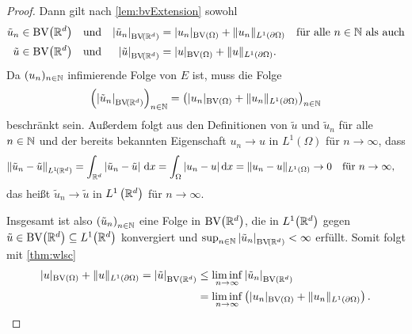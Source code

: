 \begin{proof}
  Dann gilt nach \cref{lem:bvExtension} sowohl
  \begin{align*}
    \tilde{u}_n
    &\in
    \textup{BV}\!\left(\mathbb{R}^d\right)
    &&\text{und}
    &\left|\tilde{u}_n\right|_{\textup{BV}\!\left(\mathbb{R}^d\right)} 
    &= 
    |u_n|_{\textup{BV}(\Omega)}+\Vert u_n\Vert_{L^1(\partial\Omega)}
    \quad\text{für alle }n\in\mathbb{N} \text{ als auch}\\
    \tilde{u}
    &\in
    \textup{BV}\!\left(\mathbb{R}^d\right)
    &&\text{und}
    &\left|\tilde{u}\right|_{\textup{BV}\!\left(\mathbb{R}^d\right)} 
    &=
    |u|_{\textup{BV}(\Omega)}+\Vert u\Vert_{L^1(\partial\Omega)}.
  \end{align*}
  Da $(u_n)_{n\in \mathbb{N}}$ infimierende Folge von $E$ ist, muss die Folge
  \begin{align*}
    \left(\left|\tilde{u}_n\right|_{\textup{BV}\!\left(\mathbb{R}^d\right)}\right)_{n\in\mathbb{N}} 
    = \left(|u_n|_{\textup{BV}(\Omega)}+
    \Vert u_n\Vert_{L^1(\partial\Omega)}\right)_{n\in\mathbb{N}}
  \end{align*}
  beschränkt sein.
  Außerdem folgt aus den Definitionen von $\tilde{u}$ und 
  $\tilde{u}_n$ für alle $n\in\mathbb{N}$ und der bereits bekannten Eigenschaft 
  $u_n\to u$ in $L^1(\Omega)$ für $n\to\infty$, dass
  \begin{align*}
    \left\Vert \tilde{u}_n - \tilde{u}\right\Vert_{L^1\!\left(\mathbb{R}^d\right)} 
    &= \int_{\mathbb{R}^d} \left|\tilde{u}_n - \tilde{u}\right|\,\mathrm{d}x
    = \int_\Omega |u_n - u|\,\mathrm{d}x
    = \Vert u_n - u\Vert_{L^1(\Omega)}\to 0\quad\text{für }n\to\infty,
  \end{align*}
  das heißt $\tilde{u}_n \to \tilde{u}$ in $L^1\left(\mathbb{R}^d\right)$ für
  $n\to\infty$.

  Insgesamt ist also $\left(\tilde{u}_n\right)_{n\in\mathbb{N}}$ eine Folge in
  $\textup{BV}\!\left(\mathbb{R}^d\right)$, die in $L^1\!\left(\mathbb{R}^d\right)$ gegen
  $\tilde{u}\in\textup{BV}\!\left(\mathbb{R}^d\right)\subseteq L^1\!\left(\mathbb{R}^d\right)$
  konvergiert und 
  $\sup_{n\in\mathbb{N}} \left|\tilde{u}_n\right|_{\textup{BV}\!\left(\mathbb{R}^d\right)}<\infty$
  erfüllt.
  Somit folgt mit
  \cref{thm:wlsc}  
  \begin{equation}
    \label{eq:wlscOfExtension}
    \begin{aligned}
      |u|_{\textup{BV}(\Omega)} +\Vert u\Vert_{L^1(\partial\Omega)}
      = \left|\tilde{u}\right|_{\textup{BV}\left(\mathbb{R}^d\right)}
      &\leq\liminf_{n\to\infty}
      \left|\tilde{u}_n\right|_{\textup{BV}\left(\mathbb{R}^d\right)}\\
      &= \liminf_{n\to\infty} \left(|u_n|_{\textup{BV}(\Omega)} +
      \Vert u_n\Vert_{L^1(\partial\Omega)}\right).
    \end{aligned}
  \end{equation}


\end{proof}
